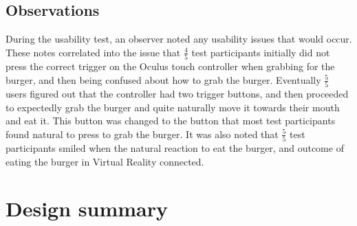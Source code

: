 \subsection{Observations}
    During the usability test, an observer noted any usability issues that would occur. These notes correlated into the issue that $\frac{4}{5}$ test participants initially did not press the correct trigger on the Oculus touch controller when grabbing for the burger, and then being confused about how to grab the burger. Eventually $\frac{5}{5}$ users figured out that the controller had two trigger buttons, and then proceeded to expectedly grab the burger and quite naturally move it towards their mouth and eat it. This button was changed to the button that most test participants found natural to press to grab the burger. It was also noted that $\frac{5}{5}$ test participants smiled when the natural reaction to eat the burger, and outcome of eating the burger in Virtual Reality connected.
    
\section{Design summary}
